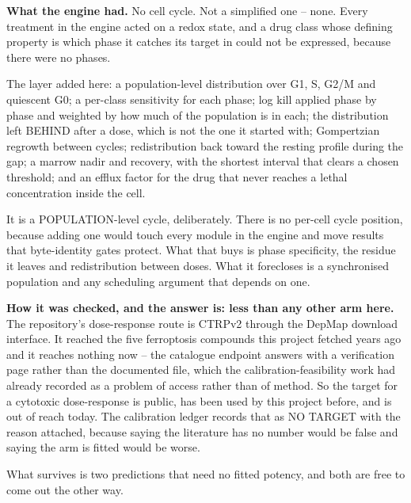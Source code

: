 \documentclass[11pt,twoside,openright]{report}
\begin{document}
\textbf{What the engine had.} No cell cycle. Not a simplified one -- none. Every treatment in the engine acted on a redox state, and a drug class whose defining property is which phase it catches its target in could not be expressed, because there were no phases.

\begin{numbers}
The layer added here: a population-level distribution over G1, S, G2/M and quiescent G0; a per-class sensitivity for each phase; log kill applied phase by phase and weighted by how much of the population is in each; the distribution left BEHIND after a dose, which is not the one it started with; Gompertzian regrowth between cycles; redistribution back toward the resting profile during the gap; a marrow nadir and recovery, with the shortest interval that clears a chosen threshold; and an efflux factor for the drug that never reaches a lethal concentration inside the cell.

It is a POPULATION-level cycle, deliberately. There is no per-cell cycle position, because adding one would touch every module in the engine and move results that byte-identity gates protect. What that buys is phase specificity, the residue it leaves and redistribution between doses. What it forecloses is a synchronised population and any scheduling argument that depends on one.
\end{numbers}

\textbf{How it was checked, and the answer is: less than any other arm here.} The repository's dose-response route is CTRPv2 through the DepMap download interface. It reached the five ferroptosis compounds this project fetched years ago and it reaches nothing now -- the catalogue endpoint answers with a verification page rather than the documented file, which the calibration-feasibility work had already recorded as a problem of access rather than of method. So the target for a cytotoxic dose-response is public, has been used by this project before, and is out of reach today. The calibration ledger records that as NO TARGET with the reason attached, because saying the literature has no number would be false and saying the arm is fitted would be worse.

What survives is two predictions that need no fitted potency, and both are free to come out the other way.
\end{document}
